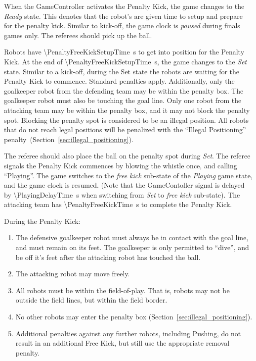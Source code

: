 When the GameController activates the Penalty Kick, the game changes to the \textit{Ready} state.
This denotes that the robot's are given time to setup and prepare for the penalty kick.
Similar to kick-off, the game clock is \textit{paused} during finals games only.
The referees should pick up the ball.

Robots have \qty{\PenaltyFreeKickSetupTime}{\second} to get into position for the Penalty Kick. At the end of \qty{\PenaltyFreeKickSetupTime}{\second}, the game changes to the \textit{Set} state.
Similar to a kick-off, during the Set state the robots are waiting for the Penalty Kick to commence.
Standard penalties apply.
Additionally, only the goalkeeper robot from the defending team may be within the penalty box. The goalkeeper robot must also be touching the goal line.
Only one robot from the attacking team may be within the penalty box, and it may not block the penalty spot.
Blocking the penalty spot is considered to be an illegal position.
All robots that do not reach legal positions will be penalized with the ``Illegal Positioning'' penalty~(\cf Section~\ref{sec:illegal_positioning}).

The referee should also place the ball on the penalty spot during \textit{Set}.
The referee signals the Penalty Kick commences by blowing the whistle once, and calling ``Playing''.
The game switches to the \textit{free kick} sub-state of the \textit{Playing} game state, and the game clock is resumed.
(Note that the GameContoller signal is delayed by \qty{\PlayingDelayTime}{\second} when switching from \textit{Set} to \textit{free kick} sub-state).
The attacking team has \qty{\PenaltyFreeKickTime}{\second} to complete the Penalty Kick.

During the Penalty Kick:
\begin{enumerate}
    \item The defensive goalkeeper robot must always be in contact with the goal line, and must remain on its feet. The goalkeeper is only permitted to ``dive'', and be off it's feet after the attacking robot has touched the ball.
    \item The attacking robot may move freely.
    \item All robots must be within the field-of-play. That is, robots may not be outside the field lines, but within the field border.
    \item No other robots may enter the penalty box (\cf Section~\ref{sec:illegal_positioning}).
    \item Additional penalties against any further robots, including Pushing, do not result in an additional Free
    Kick, but still use the appropriate removal penalty.
\end{enumerate}


